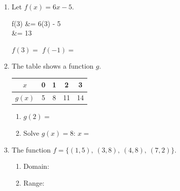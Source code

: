 \documentclass[10pt]{article}
\begin{document}

\vspace{0.12in}

\begin{enumerate}[itemsep=12pt]

\item Let $f(x) = 6x - 5$.

\begin{work}
  f(3) &= 6(3) - 5 \\
       &= 13
\end{work}

$f(3) = $  \qquad $f(-1) = $ 

\item The table shows a function $g$.

\smallskip
\begin{tabular}{|c|c|c|c|c|}
\hline
$x$ & 0 & 1 & 2 & 3 \\
\hline
$g(x)$ & 5 & 8 & 11 & 14 \\
\hline
\end{tabular}
\smallskip

\begin{enumerate}[label=(\alph*), itemsep=4pt]
  \item $g(2) = $ 
  \item Solve $g(x) = 8$: \quad $x = $ 
\end{enumerate}

\item The function $f = \{(1, 5),\ (3, 8),\ (4, 8),\ (7, 2)\}$.

\begin{enumerate}[label=(\alph*), itemsep=4pt]
  \item Domain: 
  \item Range: 
\end{enumerate}

\end{enumerate}
\end{document}
